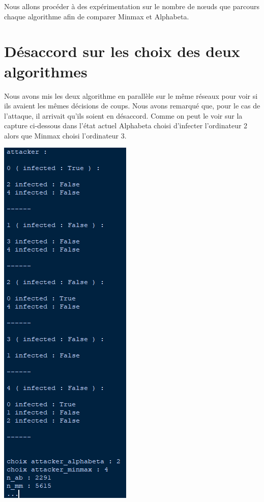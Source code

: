 \documentclass[a4paper,12pt]{article} %
\begin{document}
Nous allons procéder à des expérimentation sur le nombre de nœuds que parcours chaque algorithme afin de comparer Minmax et Alphabeta.

\section{Désaccord sur les choix des deux algorithmes}

Nous avons mis les deux algorithme en parallèle sur le même réseaux pour voir si ils avaient les mêmes décisions de coups. Nous avons remarqué que, pour le cas de l'attaque, il arrivait qu'ils soient en désaccord. Comme on peut le voir sur la capture ci-dessous dans l'état actuel Alphabeta choisi d'infecter l'ordinateur 2 alors que Minmax choisi l'ordinateur 3.

\begin{center}
\includegraphics[scale=0.7]{images/Capture2.PNG}
\end{center}
\end{document}
